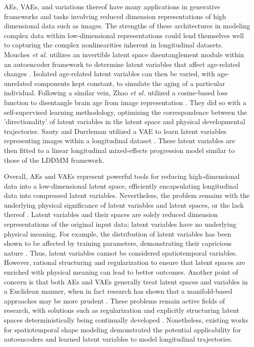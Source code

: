 	AEs, VAEs, and variations thereof have many applications in generative frameworks and tasks involving reduced dimension representations of high dimensional data such as images. The strengths of these architectures in modeling complex data within low-dimensional representations could lend themselves well to capturing the complex nonlinearities inherent in longitudinal datasets. Mouches \textit{et al.} utilizes an invertible latent space disentanglement module within an autoencoder framework to determine latent variables that affect age-related changes \cite{pmlr-v143-mouches21a}. Isolated age-related latent variables can then be varied, with age-unrelated components kept constant, to simulate the aging of a particular individual. Following a similar vein, Zhao \textit{et al.} utilized a cosine-based loss function to disentangle brain age from image representation \cite{Zhao2021}. They did so with a self-supervised learning methodology, optimizing the correspondence between the 'directionality' of latent variables in the latent space and physical developmental trajectories. Sauty and Durrleman utilized a VAE to learn latent variables representing images within a longitudinal dataset \cite{Sauty2022}. These latent variables are then fitted to a linear longitudinal mixed-effects progression model similar to those of the LDDMM framework.  
	
	Overall, AEs and VAEs represent powerful tools for reducing high-dimensional data into a low-dimensional latent space, efficiently encapsulating longitudinal data into compressed latent variables. Nevertheless, the problem remains with the underlying physical significance of latent variables and latent spaces, or the lack thereof \cite{Ehrhardt2022}. Latent variables and their spaces are solely reduced dimension representations of the original input data; latent variables have no underlying physical meaning. For example, the distribution of latent variables has been shown to be affected by training parameters, demonstrating their capricious nature \cite{Lapenda2020}. Thus, latent variables cannot be considered spatiotemporal variables. However, rational structuring and regularization to ensure that latent spaces are enriched with physical meaning can lead to better outcomes. Another point of concern is that both AEs and VAEs generally treat latent spaces and variables in a Euclidean manner, when in fact research has shown that a manifold-based approaches may be more prudent \cite{pmlr-v130-connor21a}. These problems remain active fields of research, with solutions such as regularization and explicitly structuring latent spaces deterministically being continually developed \cite{yeyeyeyeye, ghosh2020from}. Nonetheless, existing works for spatiotemporal shape modeling demonstrated the potential applicability for autoencoders and learned latent variables to model longitudinal trajectories.	
	
